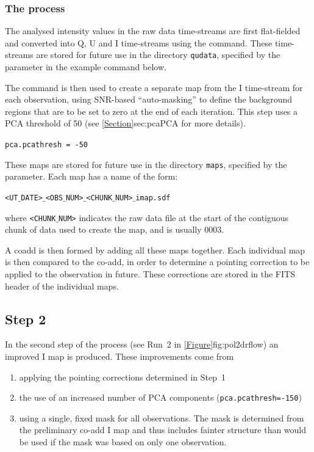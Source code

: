 \subsubsection*{The process}
The analysed intensity values in the raw data time-streams are first
flat-fielded and converted into Q, U and I time-streams using the
 command. These time-streams
are stored for future use in the directory \texttt{qudata}, specified by the
 parameter in the example command below.

The  command is then used to
create a separate map from the I time-stream for each observation,
using SNR-based ``auto-masking'' to define the background regions that
are to be set to zero at the end of each iteration. This step uses a
PCA threshold of 50 (see \cref{Section}{sec:pca}{PCA} for more details).

\texttt{pca.pcathresh = -50}

These maps are stored for future use in the directory \texttt{maps},
specified by the  parameter. Each map has a name of the form:

\texttt{<UT$\_$DATE>$\_$<OBS$\_$NUM>$\_$<CHUNK$\_$NUM>$\_$imap.sdf}

where \texttt{<CHUNK$\_$NUM>} indicates the raw data file at the start
of the contiguous chunk of data used to create the map, and is usually
0003.

A coadd is then formed by adding all these maps together. Each individual map
is then compared to the co-add, in order to determine a pointing correction
to be applied to the observation in future. These corrections are stored
in the FITS header of the individual maps.


\subsection*{Step 2}

In the second step of the process (see Run~2 in
\cref{Figure}{fig:pol2drflow}{}) an improved I map is produced. These
improvements come from
\begin{enumerate}
\item applying the pointing corrections determined in Step~1
\item the use of an increased number of PCA components
  (\texttt{pca.pcathresh=-150})
\item using a single, fixed mask for all observations. The mask is
  determined from the preliminary co-add I map and thus includes
  fainter structure than would be used if the mask was based on only
  one observation.
\end{enumerate}

